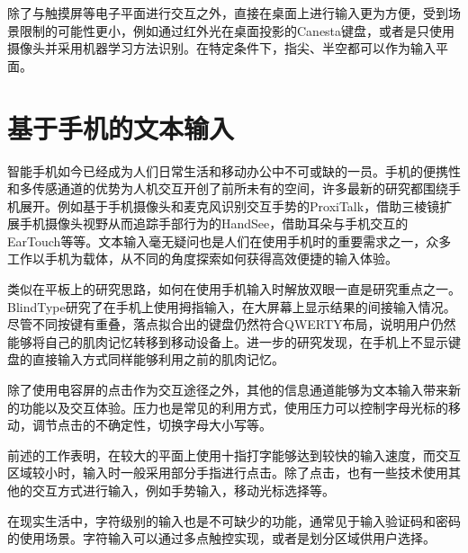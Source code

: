 除了与触摸屏等电子平面进行交互之外，直接在桌面上进行输入更为方便，受到场景限制的可能性更小，例如通过红外光在桌面投影的Canesta键盘\cite{roeber2003typing}，或者是只使用摄像头并采用机器学习方法识别\cite{murase2012gesture}。在特定条件下，指尖\cite{2019tiptext}、半空\cite{2015atk}都可以作为输入平面。

\section{基于手机的文本输入} %
智能手机如今已经成为人们日常生活和移动办公中不可或缺的一员。手机的便携性和多传感通道的优势为人机交互开创了前所未有的空间，许多最新的研究都围绕手机展开。例如基于手机摄像头和麦克风识别交互手势的ProxiTalk\cite{yang2019proxitalk}，借助三棱镜扩展手机摄像头视野从而追踪手部行为的HandSee\cite{yu2019handsee}，借助耳朵与手机交互的EarTouch\cite{wang2019eartouch}等等。文本输入毫无疑问也是人们在使用手机时的重要需求之一，众多工作以手机为载体，从不同的角度探索如何获得高效便捷的输入体验。

类似在平板上的研究思路，如何在使用手机输入时解放双眼一直是研究重点之一。BlindType\cite{2017blindtype}研究了在手机上使用拇指输入，在大屏幕上显示结果的间接输入情况。尽管不同按键有重叠，落点拟合出的键盘仍然符合QWERTY布局，说明用户仍然能够将自己的肌肉记忆转移到移动设备上。进一步的研究发现，在手机上不显示键盘的直接输入方式同样能够利用之前的肌肉记忆\cite{zhu2018typing}。

除了使用电容屏的点击作为交互途径之外，其他的信息通道能够为文本输入带来新的功能以及交互体验。压力也是常见的利用方式，使用压力可以控制字母光标的移动\cite{2018forceboard}，调节点击的不确定性\cite{weir2014uncertain}，切换字母大小写\cite{brewster2009pressure}等。



前述的工作表明，在较大的平面上使用十指打字能够达到较快的输入速度\cite{2018shitoast}，而交互区域较小时，输入时一般采用部分手指进行点击\cite{2017blindtype}\cite{zhu2018typing}。除了点击，也有一些技术使用其他的交互方式进行输入，例如手势输入\cite{murase2012gesture}\cite{zhu2019sfree}，移动光标选择\cite{2018forceboard}等。

在现实生活中，字符级别的输入也是不可缺少的功能，通常见于输入验证码和密码的使用场景。字符输入可以通过多点触控实现\cite{bonner2010no}，或者是划分区域供用户选择\cite{banovic2013escape}。

